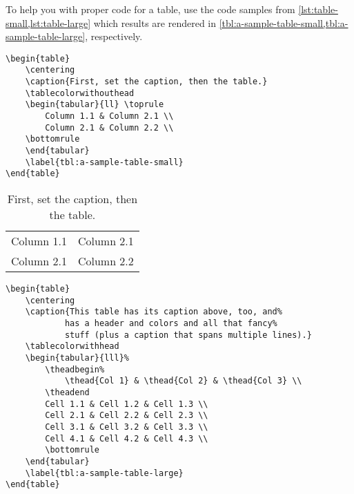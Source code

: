 To help you with proper code for a table, use the code samples from \cref{lst:table-small,lst:table-large} which results are rendered in \cref{tbl:a-sample-table-small,tbl:a-sample-table-large}, respectively.

\begin{lstlisting}[language={[LaTeX]TeX}, caption={Sample code for type setting small table.},label={lst:table-small}]
\begin{table}
    \centering
    \caption{First, set the caption, then the table.}
    \tablecolorwithouthead
    \begin{tabular}{ll} \toprule
        Column 1.1 & Column 2.1 \\
        Column 2.1 & Column 2.2 \\
    \bottomrule
    \end{tabular}
    \label{tbl:a-sample-table-small}
\end{table}
\end{lstlisting}

\begin{table}[H]
    \centering
    \caption{First, set the caption, then the table.}
    \tablecolorwithouthead
    \begin{tabular}{ll} \toprule
        Column 1.1 & Column 2.1 \\
        Column 2.1 & Column 2.2 \\
        \bottomrule
    \end{tabular}
    \label{tbl:a-sample-table-small}
\end{table}

\begin{lstlisting}[float,language={[LaTeX]TeX}, caption={Sample code for type setting table with a header.},label={lst:table-large}]
\begin{table}
    \centering
    \caption{This table has its caption above, too, and%
            has a header and colors and all that fancy%
            stuff (plus a caption that spans multiple lines).}
    \tablecolorwithhead
    \begin{tabular}{lll}%
        \theadbegin%
            \thead{Col 1} & \thead{Col 2} & \thead{Col 3} \\
        \theadend
        Cell 1.1 & Cell 1.2 & Cell 1.3 \\
        Cell 2.1 & Cell 2.2 & Cell 2.3 \\
        Cell 3.1 & Cell 3.2 & Cell 3.3 \\
        Cell 4.1 & Cell 4.2 & Cell 4.3 \\
        \bottomrule
    \end{tabular}
    \label{tbl:a-sample-table-large}
\end{table}
\end{lstlisting}

